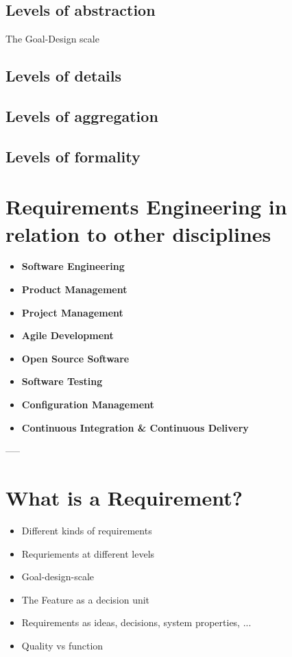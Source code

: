 \subsection*{Levels of abstraction}
The Goal-Design scale
\subsection*{Levels of details}

\subsection*{Levels of aggregation}

\subsection*{Levels of formality}



\section*{Requirements Engineering in relation to other disciplines}

\begin{itemize}
  \item \textbf{Software Engineering}
  \item \textbf{Product Management}
  \item \textbf{Project Management}
  \item \textbf{Agile Development}
  \item \textbf{Open Source Software}
  \item \textbf{Software Testing}
  \item \textbf{Configuration Management}
  \item \textbf{Continuous Integration \& Continuous Delivery}
\end{itemize}

----- 

\section{What is a Requirement?}

\begin{itemize}
  \item Different kinds of requirements
  \item Requriements at different levels
  \item Goal-design-scale
  \item The Feature as a decision unit
  \item Requirements as ideas, decisions, system properties, ...
  \item Quality vs function
\end{itemize}

